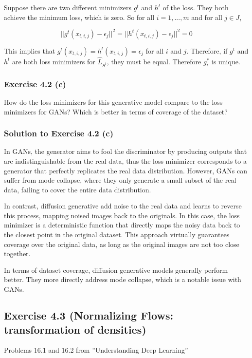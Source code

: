 \documentclass[
10pt, %
a4paper, %
oneside, %
headinclude,footinclude, %
BCOR5mm, %
]{scrartcl}
\begin{document}
Suppose there are two different minimizers $g^t$ and $h^t$ of the loss. They both achieve the minimum loss, which is zero. So for all $i = 1, ..., m$ and for all $j \in J$,

\begin{equation*}
  ||g^t(x_{t,i,j}) - \epsilon_j||^2 = ||h^t(x_{t,i,j}) - \epsilon_j||^2 = 0
\end{equation*}

This implies that $g^t(x_{t,i,j}) = h^t(x_{t,i,j}) = \epsilon_j$ for all $i$ and $j$. Therefore, if $g^t$ and $h^t$ are both loss minimizers for $\hat{L}_{S^t}$, they must be equal. Therefore $g^*_t$ is unique.

\subsubsection*{Exercise 4.2 (c)}
How do the loss minimizers for this generative model compare to the loss minimizers for GANs? Which is better in terms of coverage of the dataset?

\subsubsection*{Solution to Exercise 4.2 (c)}

In GANs, the generator aims to fool the discriminator by producing outputs that are indistinguishable from the real data, thus the loss minimizer corresponds to a generator that perfectly replicates the real data distribution. However, GANs can suffer from mode collapse, where they only generate a small subset of the real data, failing to cover the entire data distribution.

In contrast, diffusion generative add noise to the real data and learns to reverse this process, mapping noised images back to the originals. In this case, the loss minimizer is a deterministic function that directly maps the noisy data back to the closest point in the original dataset. This approach virtually guarantees coverage over the original data, as long as the original images are not too close together.

In terms of dataset coverage, diffusion generative models generally perform better. They more directly address mode collapse, which is a notable issue with GANs.

\newpage

\subsection*{Exercise 4.3 (Normalizing Flows: transformation of densities)}
Problems 16.1 and 16.2 from ”Understanding Deep Learning”
\end{document}
